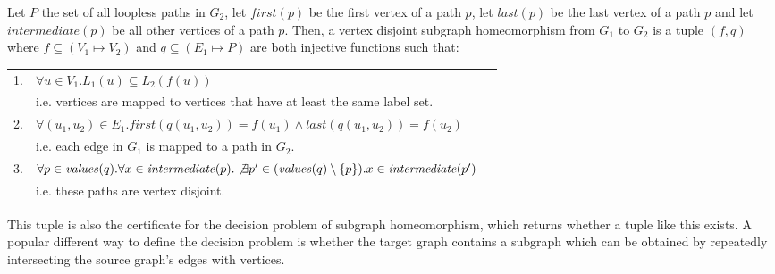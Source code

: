 \begin{defn}
Let $P$ the set of all loopless paths in $G_2$, let $first(p)$ be the first vertex of a path $p$, let $last(p)$ be the last vertex of a path $p$ and let $intermediate(p)$ be all other vertices of a path $p$. Then, a vertex disjoint subgraph homeomorphism from $G_1$ to $G_2$ is a tuple $(f, q)$ where $f\subseteq (V_1 \mapsto V_2)$ and $q \subseteq (E_1 \mapsto P)$ are both injective functions such that:

\begin{tabular}{rlr}
 1. & $\forall u \in V_1 . L_1(u)\subseteq L_2(f(u))$&\\
 
 &i.e. vertices are mapped to vertices that have at least the same label set.&\\
 
 2. & $\forall (u_1, u_2) \in E_1 .\mathit{first}(q(u_1, u_2))=f(u_1) \land \mathit{last}(q(u_1, u_2))=f(u_2)$&\\
 &i.e. each edge in $G_1$ is mapped to a path in $G_2$.&\\
 
 3. & $\forall p \in \mathit{values}(q) . \forall x \in \mathit{intermediate}(p) . \not \exists p' \in (\mathit{values}(q) \setminus \{p\}) . x \in \mathit{intermediate}(p')$&\\
    &i.e. these paths are vertex disjoint.&\\
\end{tabular}

This tuple is also the certificate for the decision problem of subgraph homeomorphism, which returns whether a tuple like this exists. A popular different way to define the decision problem is whether the target graph contains a subgraph which can be obtained by repeatedly intersecting the source graph's edges with vertices.

\label{def:pathsubgraphisomorphism}
\end{defn}


